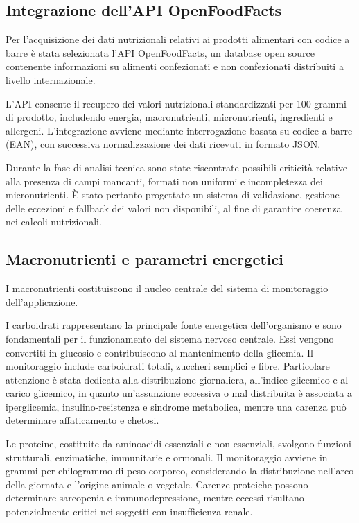 \documentclass[a4paper,12pt]{article}
\begin{document}
    \subsection{Integrazione dell'API OpenFoodFacts}

    Per l’acquisizione dei dati nutrizionali relativi ai prodotti alimentari con codice a barre è stata selezionata l’API OpenFoodFacts, un database open source contenente informazioni su alimenti confezionati e non confezionati distribuiti a livello internazionale.

    L’API consente il recupero dei valori nutrizionali standardizzati per 100 grammi di prodotto, includendo energia, macronutrienti, micronutrienti, ingredienti e allergeni. L’integrazione avviene mediante interrogazione basata su codice a barre (EAN), con successiva normalizzazione dei dati ricevuti in formato JSON.

    Durante la fase di analisi tecnica sono state riscontrate possibili criticità relative alla presenza di campi mancanti, formati non uniformi e incompletezza dei micronutrienti. È stato pertanto progettato un sistema di validazione, gestione delle eccezioni e fallback dei valori non disponibili, al fine di garantire coerenza nei calcoli nutrizionali.

    \subsection{Macronutrienti e parametri energetici}

    I macronutrienti costituiscono il nucleo centrale del sistema di monitoraggio dell’applicazione.

    I carboidrati rappresentano la principale fonte energetica dell’organismo e sono fondamentali per il funzionamento del sistema nervoso centrale. Essi vengono convertiti in glucosio e contribuiscono al mantenimento della glicemia. Il monitoraggio include carboidrati totali, zuccheri semplici e fibre. Particolare attenzione è stata dedicata alla distribuzione giornaliera, all’indice glicemico e al carico glicemico, in quanto un’assunzione eccessiva o mal distribuita è associata a iperglicemia, insulino-resistenza e sindrome metabolica, mentre una carenza può determinare affaticamento e chetosi.

    Le proteine, costituite da aminoacidi essenziali e non essenziali, svolgono funzioni strutturali, enzimatiche, immunitarie e ormonali. Il monitoraggio avviene in grammi per chilogrammo di peso corporeo, considerando la distribuzione nell’arco della giornata e l’origine animale o vegetale. Carenze proteiche possono determinare sarcopenia e immunodepressione, mentre eccessi risultano potenzialmente critici nei soggetti con insufficienza renale.
\end{document}
